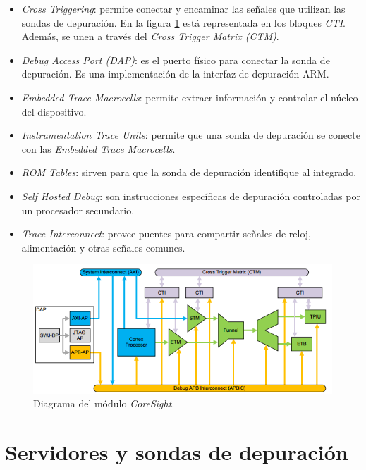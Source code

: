 \begin{itemize}
    \item \emph{Cross Triggering}: permite conectar y encaminar las señales que utilizan las sondas de depuración.
        En la figura \ref{fig:coresight} está representada en los bloques \emph{CTI}.
        Además, se unen a través del \emph{Cross Trigger Matrix (CTM)}.
    \item \emph{Debug Access Port (DAP)}: es el puerto físico para conectar la sonda de depuración. Es una implementación de la interfaz de depuración ARM.
    \item \emph{Embedded Trace Macrocells}: permite extraer información y controlar el núcleo del dispositivo.
    \item \emph{Instrumentation Trace Units}: permite que una sonda de depuración se conecte con las \emph{Embedded Trace Macrocells}.
    \item \emph{ROM Tables}: sirven para que la sonda de depuración identifique al integrado.
    \item \emph{Self Hosted Debug}: son instrucciones específicas de depuración controladas por un procesador secundario.
    \item \emph{Trace Interconnect}: provee puentes para compartir señales de reloj, alimentación y otras señales comunes.
\end{itemize}

\begin{figure}[htbp]
	\centering
	\includegraphics[width=\textwidth]{./Figures/coresight.png}
    \caption{Diagrama del módulo \emph{CoreSight}\protect\footnotemark.}
	\label{fig:coresight}
\end{figure}

\section{Servidores y sondas de depuración}
\label{sec:depuracion}

